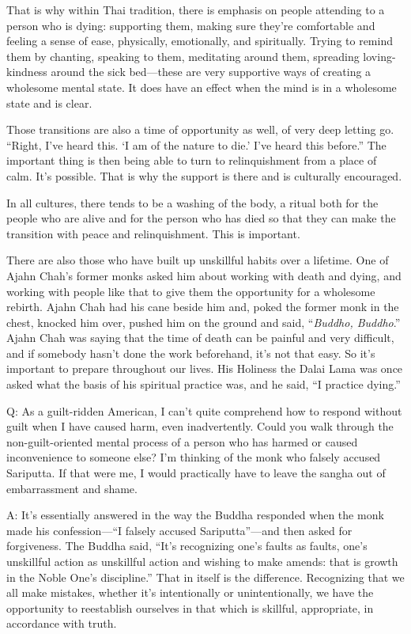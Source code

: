 That is why within Thai tradition, there is emphasis on people attending
to a person who is dying: supporting them, making sure they’re
comfortable and feeling a sense of ease, physically, emotionally, and
spiritually. Trying to remind them by chanting, speaking to them,
meditating around them, spreading loving-kindness around the sick
bed—these are very supportive ways of creating a wholesome mental state.
It does have an effect when the mind is in a wholesome state and is
clear.

Those transitions are also a time of opportunity as well, of very deep
letting go. “Right, I’ve heard this. ‘I am of the nature to die.’ I’ve
heard this before.” The important thing is then being able to turn to
relinquishment from a place of calm. It’s possible. That is why the
support is there and is culturally encouraged.

In all cultures, there tends to be a washing of the body, a ritual both
for the people who are alive and for the person who has died so that
they can make the transition with peace and relinquishment. This is
important.

There are also those who have built up unskillful habits over a
lifetime. One of Ajahn Chah’s former monks asked him about working with
death and dying, and working with people like that to give them the
opportunity for a wholesome rebirth. Ajahn Chah had his cane beside him
and, poked the former monk in the chest, knocked him over, pushed him on
the ground and said, “\emph{Buddho, Buddho}.” Ajahn Chah was saying that
the time of death can be painful and very difficult, and if somebody
hasn’t done the work beforehand, it’s not that easy. So it’s important
to prepare throughout our lives. His Holiness the Dalai Lama was once
asked what the basis of his spiritual practice was, and he said, “I
practice dying.”

\vspace{\the\qaskip}
Q: As a guilt-ridden American, I can’t quite comprehend how to respond
without guilt when I have caused harm, even inadvertently. Could you
walk through the non-guilt-oriented mental process of a person who has
harmed or caused inconvenience to someone else? I’m thinking of the monk
who falsely accused Sariputta. If that were me, I would practically have
to leave the sangha out of embarrassment and shame.

\vspace{\the\qaskip}
A: It’s essentially answered in the way the Buddha responded when the
monk made his confession—“I falsely accused Sariputta”—and then asked
for forgiveness. The Buddha said, “It’s recognizing one’s faults as
faults, one’s unskillful action as unskillful action and wishing to make
amends: that is growth in the Noble One’s discipline.” That in itself is
the difference. Recognizing that we all make mistakes, whether it’s
intentionally or unintentionally, we have the opportunity to reestablish
ourselves in that which is skillful, appropriate, in accordance with
truth.

